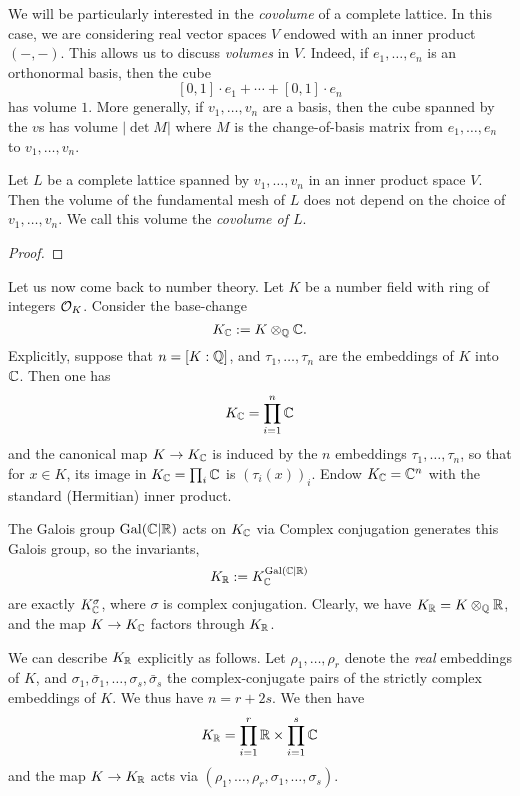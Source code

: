 We will be particularly interested in the \emph{covolume} of a complete lattice.
In this case, we are considering real vector spaces $V$ endowed with an inner product $(-,-)$.
This allows us to discuss \emph{volumes} in $V$.
Indeed, if $e_{1},\ldots,e_{n}$ is an orthonormal basis, then the cube
\[ [0,1] \cdot e_{1} + \cdots + [0,1] \cdot e_{n} \]
has volume $1$.
More generally, if $v_{1},\ldots,v_{n}$ are a basis, then the cube spanned by the $v$s has volume $|\det M|$ where $M$ is the change-of-basis matrix from $e_{1},\ldots,e_{n}$ to $v_{1},\ldots,v_{n}$.

\begin{lemma}
  Let $L$ be a complete lattice spanned by $v_{1},\ldots,v_{n}$ in an inner product space $V$.
  Then the volume of the fundamental mesh of $L$ does not depend on the choice of $v_{1},\ldots,v_{n}$.
  We call this volume the \emph{covolume of $L$}.
\end{lemma}
\begin{proof}
\end{proof}

Let us now come back to number theory.
Let $K$ be a number field with ring of integers $\mathcal{O}_{K}$.
Consider the base-change
\[ K_{\mathbb{C}} := K \otimes_{\mathbb{Q}} \mathbb{C}. \]
Explicitly, suppose that $n = [K:\mathbb{Q}]$, and $\tau_{1},\ldots,\tau_{n}$ are the  embeddings of $K$ into $\mathbb{C}$.
Then one has
\[ K_{\mathbb{C}} = \prod_{i = 1}^{n} \mathbb{C} \]
and the canonical map $K \to K_{\mathbb{C}}$ is induced by the $n$ embeddings $\tau_{1},\ldots,\tau_{n}$, so that for $x \in K$, its image in $K_{\mathbb{C}} = \prod_{i} \mathbb{C}$ is $(\tau_{i}(x))_{i}$.
Endow $K_{\mathbb{C}} = \mathbb{C}^{n}$ with the standard (Hermitian) inner product.

The Galois group $\operatorname{Gal}(\mathbb{C}|\mathbb{R})$ acts on $K_{\mathbb{C}}$ via 
Complex conjugation generates this Galois group, so the invariants,
\[ K_{\mathbb{R}} := K_{\mathbb{C}}^{\operatorname{Gal}(\mathbb{C}|\mathbb{R})} \]
are exactly $K_{\mathbb{C}}^{\sigma}$, where $\sigma$ is complex conjugation.
Clearly, we have $K_{\mathbb{R}} = K \otimes_{\mathbb{Q}} \mathbb{R}$, and the map $K \to K_{\mathbb{C}}$ factors through $K_{\mathbb{R}}$.

We can describe $K_{\mathbb{R}}$ explicitly as follows.
Let $\rho_{1},\ldots,\rho_{r}$ denote the \emph{real} embeddings of $K$, and $\sigma_{1},\bar\sigma_{1},\ldots,\sigma_{s},\bar\sigma_{s}$ the complex-conjugate pairs of the strictly complex embeddings of $K$.
We thus have $n = r + 2s$.
We then have
\[ K_{\mathbb{R}} = \prod_{i = 1}^{r} \mathbb{R} \times \prod_{i = 1}^{s} \mathbb{C} \]
and the map $K \to K_{\mathbb{R}}$ acts via $(\rho_{1},\ldots,\rho_{r},\sigma_{1},\ldots,\sigma_{s})$.


